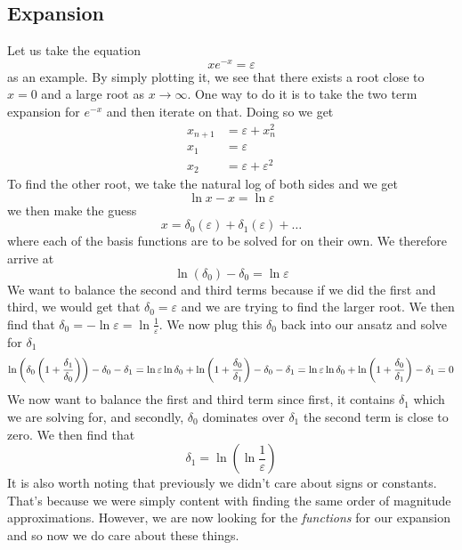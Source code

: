 \documentclass{article}
\begin{document}
\subsection{Expansion}
Let us take the equation 
\begin{equation*}
    xe^{-x}=\varepsilon
\end{equation*}
as an example. By simply plotting it, we see that there exists a root close to $x=0$ and a large root as $x\rightarrow \infty$. One way to do it is to take the two term expansion for $e^{-x}$ and then iterate on that. Doing so we get 
\begin{equation*}
    \begin{split}
        x_{n+1}&=\varepsilon+x_n^2\\
        x_1&=\varepsilon\\
        x_2&=\varepsilon+\varepsilon^2
    \end{split}
\end{equation*}
To find the other root, we take the natural log of both sides and we get 
\begin{equation*}
    \ln x-x=\ln \varepsilon
\end{equation*}
we then make the guess 
\begin{equation*}
    x=\delta_0(\varepsilon)+\delta_1(\varepsilon)+\ldots
\end{equation*}
where each of the basis functions are to be solved for on their own. We therefore arrive at 
\begin{equation*}
    \ln(\delta_0)-\delta _0=\ln \varepsilon
\end{equation*}
We want to balance the second and third terms because if we did the first and third, we would get that $\delta_0=\varepsilon$ and we are trying to find the larger root. We then find that $\delta_0=-\ln \varepsilon = \ln \frac{1}{\varepsilon}$. We now plug this $\delta_0$ back into our ansatz and solve for $\delta_1$ 
\begin{equation*}
    \ln \left( \delta_0\left(1+\frac{\delta_1}{\delta_0} \right) \right) - \delta_0 -\delta_1=\ln \varepsilon \\
    \ln \delta_0+\ln\left(1+\frac{\delta_0}{\delta_1}\right)-\delta_0-\delta_1=\ln \varepsilon \\
    \ln \delta_0+\ln\left(1+\frac{\delta_0}{\delta_1} \right) -\delta_1=0
\end{equation*}
We now want to balance the first and third term since first, it contains $\delta_1$ which we are solving for, and secondly, $\delta_0$ dominates over $\delta_1$ the second term is close to zero. We then find that 
\begin{equation*}
    \delta_1=\ln\left(\ln\frac{1}{\varepsilon}\right)
\end{equation*}
It is also worth noting that previously we didn't care about signs or constants. That's because we were simply content with finding the same order of magnitude approximations. However, we are now looking for the \emph{functions} for our expansion and so now we do care about these things.
\end{document}
